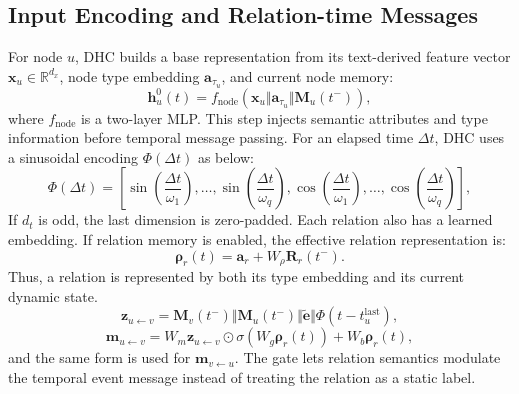 \subsection{Input Encoding and Relation-time Messages}
For node $u$, DHC builds a base representation from its text-derived feature vector $\mathbf{x}_u\in\mathbb{R}^{d_x}$, node type embedding $\mathbf{a}_{\tau_u}$, and current node memory:
\begin{equation}
\mathbf{h}^{0}_{u}(t)=f_{\mathrm{node}}\left(\mathbf{x}_{u}\Vert\mathbf{a}_{\tau_u}\Vert\mathbf{M}_{u}(t^{-})\right),
\label{eq:base_node}
\end{equation}
where $f_{\mathrm{node}}$ is a two-layer MLP. This step injects semantic attributes and type information before temporal message passing.
For an elapsed time $\Delta t$, DHC uses a sinusoidal encoding $\Phi(\Delta t)$ as below:
\begin{equation}
\Phi(\Delta t)=\left[\sin\left(\frac{\Delta t}{\omega_1}\right),\ldots,\sin\left(\frac{\Delta t}{\omega_q}\right),
\cos\left(\frac{\Delta t}{\omega_1}\right),\ldots,\cos\left(\frac{\Delta t}{\omega_q}\right)\right],
\label{eq:time_encoding}
\end{equation}
If $d_t$ is odd, the last dimension is zero-padded. 
Each relation also has a learned embedding. If relation memory is enabled, the effective relation representation is:
\begin{equation}
\boldsymbol{\rho}_{r}(t)=\mathbf{a}_{r}+W_{\rho}\mathbf{R}_{r}(t^{-}).
\label{eq:relation_state}
\end{equation}
Thus, a relation is represented by both its type embedding and its current dynamic state. 
\begin{equation}
\mathbf{z}_{u\leftarrow v}=\mathbf{M}_{v}(t^{-})\Vert\mathbf{M}_{u}(t^{-})\Vert\tilde{\mathbf{e}}\Vert\Phi(t-t_{u}^{\mathrm{last}}),
\end{equation}
\begin{equation}
\mathbf{m}_{u\leftarrow v}=W_m\mathbf{z}_{u\leftarrow v}\odot\sigma(W_g\boldsymbol{\rho}_{r}(t)) + W_b\boldsymbol{\rho}_{r}(t),
\label{eq:rel_time_msg}
\end{equation}
and the same form is used for $\mathbf{m}_{v\leftarrow u}$. The gate lets relation semantics modulate the temporal event message instead of treating the relation as a static label.

